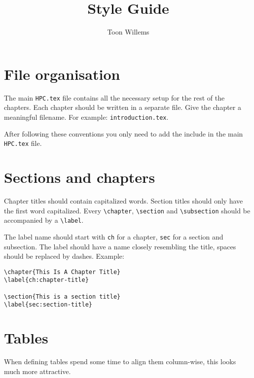 \documentclass[11pt,a4paper]{article}
\title{Style Guide}
\author{Toon Willems}
\begin{document}
\maketitle

\section{File organisation}
\label{sec:file-organisation}

The main \texttt{HPC.tex} file contains all the necessary setup for the rest of
the chapters. Each chapter should be written in a separate file. Give the
chapter a meaningful filename. For example: \texttt{introduction.tex}.

After following these conventions you only need to add the include in the main
\texttt{HPC.tex} file.

\section{Sections and chapters}
\label{sec:sections-and-chapters}

Chapter titles should contain capitalized words. Section titles should only
have the first word capitalized. Every \texttt{\textbackslash{}chapter},
\texttt{\textbackslash{}section} and \texttt{\textbackslash{}subsection} should
be accompanied by a \texttt{\textbackslash{}label}.

The label name should start with \texttt{ch} for a chapter, \texttt{sec} for a
section and subsection. The label should have a name closely resembling the
title, spaces should be replaced by dashes. Example:

\begin{verbatim}
\chapter{This Is A Chapter Title}
\label{ch:chapter-title}

\section{This is a section title}
\label{sec:section-title}
\end{verbatim}

\section{Tables}
\label{sec:tables}

When defining tables spend some time to align them column-wise, this looks much more attractive.
\end{document}
